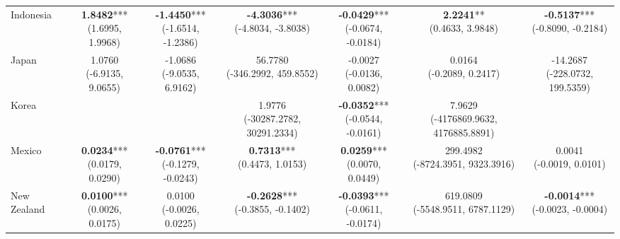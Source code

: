\begin{table}[htbp]
{\begin{tabular}{l|cccccc}
Indonesia            & \makecell{\textbf{1.8482}*** \\ \scriptsize{(1.6995, 1.9968)}} & \makecell{\textbf{-1.4450}*** \\ \scriptsize{(-1.6514, -1.2386)}} & \makecell{\textbf{-4.3036}*** \\ \scriptsize{(-4.8034, -3.8038)}} & \makecell{\textbf{-0.0429}*** \\ \scriptsize{(-0.0674, -0.0184)}} & \makecell{\textbf{2.2241}** \\ \scriptsize{(0.4633, 3.9848)}} & \makecell{\textbf{-0.5137}*** \\ \scriptsize{(-0.8090, -0.2184)}} \\
Japan                & \makecell{1.0760 \\ \scriptsize{(-6.9135, 9.0655)}} & \makecell{-1.0686 \\ \scriptsize{(-9.0535, 6.9162)}} & \makecell{56.7780 \\ \scriptsize{(-346.2992, 459.8552)}} & \makecell{-0.0027 \\ \scriptsize{(-0.0136, 0.0082)}} & \makecell{0.0164 \\ \scriptsize{(-0.2089, 0.2417)}} & \makecell{-14.2687 \\ \scriptsize{(-228.0732, 199.5359)}} \\
Korea                &   &   & \makecell{1.9776 \\ \scriptsize{(-30287.2782, 30291.2334)}} & \makecell{\textbf{-0.0352}*** \\ \scriptsize{(-0.0544, -0.0161)}} & \makecell{7.9629 \\ \scriptsize{(-4176869.9632, 4176885.8891)}} &   \\
Mexico               & \makecell{\textbf{0.0234}*** \\ \scriptsize{(0.0179, 0.0290)}} & \makecell{\textbf{-0.0761}*** \\ \scriptsize{(-0.1279, -0.0243)}} & \makecell{\textbf{0.7313}*** \\ \scriptsize{(0.4473, 1.0153)}} & \makecell{\textbf{0.0259}*** \\ \scriptsize{(0.0070, 0.0449)}} & \makecell{299.4982 \\ \scriptsize{(-8724.3951, 9323.3916)}} & \makecell{0.0041 \\ \scriptsize{(-0.0019, 0.0101)}} \\
New Zealand          & \makecell{\textbf{0.0100}*** \\ \scriptsize{(0.0026, 0.0175)}} & \makecell{0.0100 \\ \scriptsize{(-0.0026, 0.0225)}} & \makecell{\textbf{-0.2628}*** \\ \scriptsize{(-0.3855, -0.1402)}} & \makecell{\textbf{-0.0393}*** \\ \scriptsize{(-0.0611, -0.0174)}} & \makecell{619.0809 \\ \scriptsize{(-5548.9511, 6787.1129)}} & \makecell{\textbf{-0.0014}*** \\ \scriptsize{(-0.0023, -0.0004)}} \\

\end{tabular}}
\end{table}
